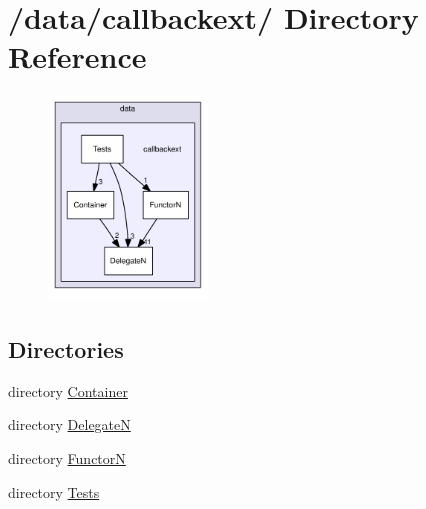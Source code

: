 \hypertarget{dir_000001}{
\section{/data/callbackext/ Directory Reference}
\label{dir_000001}
}


\begin{figure}[H]
\begin{center}
\leavevmode
\includegraphics[width=120pt]{dir_000001_dep}
\end{center}
\end{figure}
\subsection*{Directories}
\begin{CompactItemize}
\item 
directory \hyperlink{dir_000002}{Container}
\item 
directory \hyperlink{dir_000003}{Delegate\-N}
\item 
directory \hyperlink{dir_000004}{Functor\-N}
\item 
directory \hyperlink{dir_000005}{Tests}
\end{CompactItemize}
